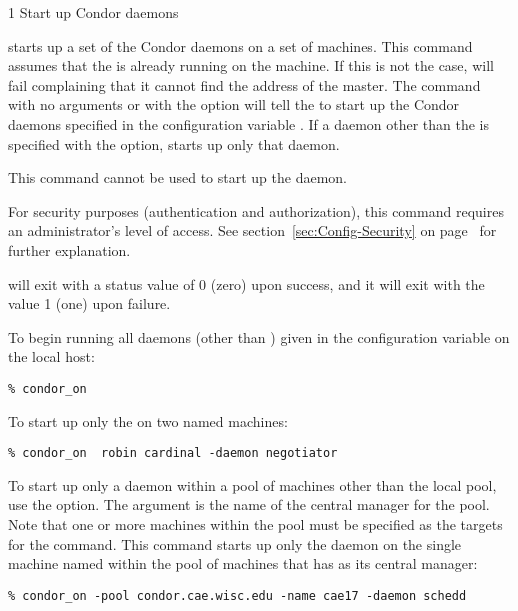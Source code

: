 \begin{ManPage}{\label{man-condor-on}}{1}
{Start up Condor daemons}
\Synopsis {}
\ToolArgsBase

\ToolDebugOption
\ToolWhere \ToolArgsAffect


\Description 

 starts up a set of the Condor daemons on a set of
machines.
This command assumes that the  is already
running on the machine.
If this is not the case,  will
fail complaining that it cannot find the address of the master.
The command  with no arguments or with
 the  option will
tell the  to start up the Condor daemons specified
in the configuration variable .
If a daemon other than the  is specified
with the  option,
 starts up only that daemon.

This command cannot be used to start up the  daemon.

For security purposes (authentication and authorization),
this command requires an administrator's level of access.
See
section~\ref{sec:Config-Security} on page~\pageref{sec:Config-Security}
for further explanation.

\begin{Options}
    \ToolArgsBaseDesc
    \ToolDebugDesc
    \ToolArgsLocateDesc
    \ToolArgsAffectDesc
\end{Options}

\ExitStatus

 will exit with a status value of 0 (zero) upon success,
and it will exit with the value 1 (one) upon failure.

\Examples
To begin running all daemons (other than ) given
in the configuration variable 
on the local host:
\begin{verbatim}
% condor_on
\end{verbatim}

To start up only the  on two named machines:
\begin{verbatim}
% condor_on  robin cardinal -daemon negotiator
\end{verbatim}

To start up only a daemon within a pool of machines
other than the local pool, use the  option.
The argument is the name of the central manager for the pool.
Note that one or more machines within the pool must be
specified as the targets for the command.
This command starts up only the  daemon
on the single machine named  within the
pool of machines that has  as
its central manager:
\begin{verbatim}
% condor_on -pool condor.cae.wisc.edu -name cae17 -daemon schedd
\end{verbatim}

\end{ManPage}
